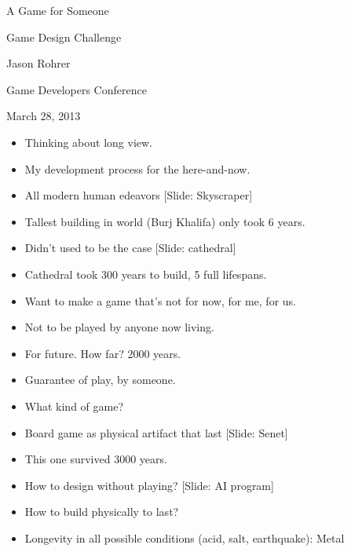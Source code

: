 \documentclass[12pt]{article}
\begin{document}
\begin{center}
A Game for Someone

Game Design Challenge

Jason Rohrer

Game Developers Conference 

March 28, 2013
\end{center}


{\Huge



\begin{itemize}

\item Thinking about long view.

\item My development process for the here-and-now.

\item All modern human edeavors [Slide:  Skyscraper]

\item Tallest building in world (Burj Khalifa) only took 6 years.

\item Didn't used to be the case [Slide:  cathedral]

\item Cathedral took 300 years to build, 5 full lifespans.

\item Want to make a game that's not for now, for me, for us.

\item Not to be played by anyone now living.

\item For future.  How far?  2000 years.

\item Guarantee of play, by someone.

\item What kind of game?  

\item Board game as physical artifact that last [Slide:  Senet]

\item This one survived 3000 years.

\item How to design without playing?  [Slide:  AI program]

\item How to build physically to last? 

\item Longevity in all possible conditions (acid, salt, earthquake):  Metal


\end{itemize}}
\end{document}
